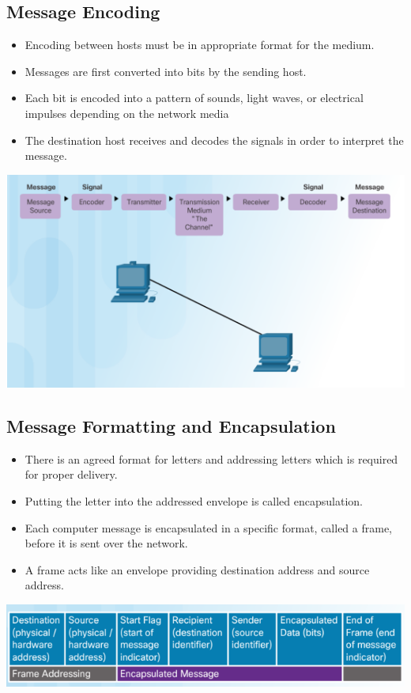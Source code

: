 \documentclass[11pt]{article}
\begin{document}
\subsection{Message Encoding}
    \begin{itemize}
        \item Encoding between hosts must be in appropriate format for the medium.
        \item Messages are first converted into bits by the sending host.
        \item Each bit is encoded into a pattern of sounds, light waves, or electrical impulses depending on the network media
        \item The destination host receives and decodes the signals in order to interpret the message.
    \end{itemize}
    \includegraphics[width=\textwidth]{message-encoding}
\subsection{Message Formatting and Encapsulation}
    \begin{itemize}
        \item There is an agreed format for letters and addressing letters which is required for proper delivery.
        \item Putting the letter into the addressed envelope is called encapsulation.
        \item Each computer message is encapsulated in a specific format, called a frame, before it is sent over the network.
        \item A frame acts like an envelope providing destination address and source address.
    \end{itemize}
    \includegraphics[width=\textwidth]{message-formatting-and-encapsulation}
\end{document}
